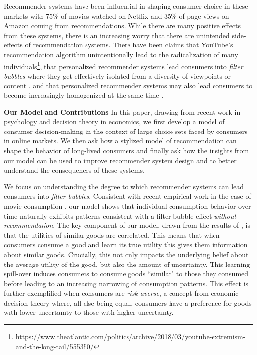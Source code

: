 \documentclass[sigconf]{acmart}
\begin{document}
Recommender systems have been influential in shaping consumer choice in these markets with 75\% of movies watched on Netflix and 35\% of page-views on Amazon coming from recommendations. While there are many positive effects from these systems, there is an increasing worry that there are unintended side-effects of recommendation systems. There have been claims that YouTube's recommendation algorithm unintentionally lead to the radicalization of many individuals\footnote{https://www.theatlantic.com/politics/archive/2018/03/youtube-extremism-and-the-long-tail/555350/}, that personalized recommender systems lead consumers into \textit{filter bubbles} where they get effectively isolated from a diversity of viewpoints or content \cite{pariser2011filter}, and that personalized recommender systems may also lead consumers to become increasingly homogenized at the same time \cite{chaney2018algorithmic, hosanagar2013will}.

\textbf{Our Model and Contributions} In this paper, drawing from recent work in psychology and decision theory in economics, we first develop a model of consumer decision-making in the context of large choice sets faced by consumers in online markets. We then ask how a stylized model of recommendation can shape the behavior of long-lived consumers and finally ask how the insights from our model can be used to improve recommender system design and to better understand the consequences of these systems.

We focus on understanding the degree to which recommender systems can lead consumers into \textit{filter bubbles}. Consistent with recent empirical work in the case of movie consumption \cite{nguyen2014exploring}, our model shows that individual consumption behavior over time naturally exhibits patterns consistent with a filter bubble effect \textit{without recommendation}. The key component of our model, drawn from the results of \cite{schulz2019structured}, is that the utilities of similar goods are correlated. This means that when consumers consume a good and learn its true utility this gives them information about similar goods. Crucially, this not only impacts the underlying belief about the average utility of the good, but also the amount of uncertainty. This learning spill-over induces consumers to consume goods ``similar" to those they consumed before leading to an increasing narrowing of consumption patterns. This effect is further exemplified when consumers are \textit{risk-averse}, a concept from economic decision theory where, all else being equal, consumers have a preference for goods with lower uncertainty to those with higher uncertainty.
\end{document}
